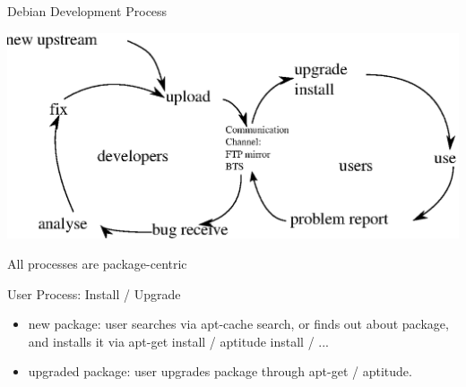 \documentclass[cjk,dvipdfm,12pt]{beamer}
\begin{document}
\begin{frame}{Debian Development Process}

\includegraphics[width=1\hsize]{image200805/develcycle.eps} 

All processes are package-centric

\end{frame}

\begin{frame}{User Process: Install / Upgrade}
 \begin{itemize}
  \item new package: 
	user searches via apt-cache search, or finds out about package,
	and installs it via apt-get install / aptitude install / ...
  \item upgraded package:
	user upgrades package through 
	apt-get  / aptitude.	
 \end{itemize}
\end{frame}
\end{document}
